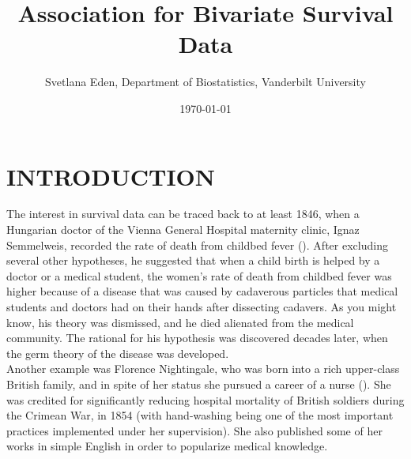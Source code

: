 \documentclass[]{article}
\title{Association for Bivariate Survival Data}
\author{Svetlana Eden, Department of Biostatistics, Vanderbilt University}
\date{\today}
\begin{document}
\maketitle
\tableofcontents
\listoffigures
\listoftables
\clearpage

\section{INTRODUCTION}
The interest in survival data can be traced back to at least 1846, when a Hungarian doctor of the Vienna General Hospital maternity clinic, Ignaz Semmelweis, recorded the rate of death from childbed fever (\cite{wiki:IgnazSemmelweis}). After excluding several other hypotheses, he suggested that when a child birth is helped by a doctor or a medical student, the women's rate of death from childbed fever was higher because of a disease that was caused by cadaverous particles that medical students and doctors had on their hands after dissecting cadavers. As you might know, his theory was dismissed, and he died alienated from the medical community. The rational for his hypothesis was discovered decades later, when the germ theory of the disease was developed. \\


Another example was Florence Nightingale, who was born into a rich upper-class British family, and in spite of her status she pursued a career of a nurse (\cite{wiki:FlorenceNightingale}). She was credited for significantly reducing hospital mortality of British soldiers during the Crimean War, in 1854 (with hand-washing being one of the most important practices implemented under her supervision). She also published some of her works in simple English in order to popularize medical knowledge.\\
\end{document}
